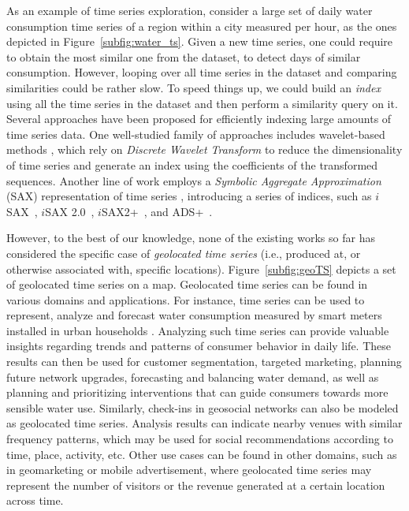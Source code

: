 As an example of time series exploration, consider a large set of daily water consumption time series of a region within a city measured per hour, as the ones depicted in Figure~\ref{subfig:water_ts}. Given a new time series, one could require to obtain the most similar one from the dataset, to detect days of similar consumption. However, looping over all time series in the dataset and comparing similarities could be rather slow. To speed things up, we could build an \textit{index} using all the time series in the dataset and then perform a similarity query on it. Several approaches have been proposed for efficiently indexing large amounts of time series data. One well-studied family of approaches includes wavelet-based methods \cite{chan1999icde}, which rely on \textit{Discrete Wavelet Transform} \cite{graps1995cse} to reduce the dimensionality of time series and generate an index using the coefficients of the transformed sequences. Another line of work employs a \textit{Symbolic Aggregate Approximation} (SAX) representation of time series \cite{jessica2007dmkd}, introducing a series of indices, such as $i$SAX~\cite{shieh2008kdd}, $i$SAX 2.0~\cite{camerra2010icdm}, $i$SAX2+~\cite{camerra2014kais}, and ADS+~\cite{zoumpatianos2014sigmod}.

However, to the best of our knowledge, none of the existing works so far has considered the specific case of \textit{geolocated time series} (i.e., produced at, or otherwise associated with, specific locations). Figure~\ref{subfig:geoTS} depicts a set of geolocated time series on a map. Geolocated time series can be found in various domains and applications. For instance, time series can be used to represent, analyze and forecast water consumption measured by smart meters installed in urban households \cite{DBLP:conf/edbt/ChronisGA16}. Analyzing such time series can provide valuable insights regarding trends and patterns of consumer behavior in daily life. These results can then be used for customer segmentation, targeted marketing, planning future network upgrades, forecasting and balancing water demand, as well as planning and prioritizing interventions that can guide consumers towards more sensible water use. Similarly, check-ins in geosocial networks can also be modeled as geolocated time series. Analysis results can indicate nearby venues with similar frequency patterns, which may be used for social recommendations according to time, place, activity, etc. Other use cases can be found in other domains, such as in geomarketing or mobile advertisement, where geolocated time series may represent the number of visitors or the revenue generated at a certain location across time.

